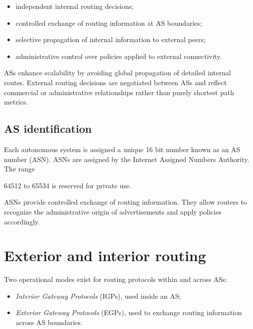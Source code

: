 \begin{itemize}
\item independent internal routing decisions;
\item controlled exchange of routing information at AS boundaries;
\item selective propagation of internal information to external peers;
\item administrative control over policies applied to external connectivity.
\end{itemize}

\begin{center}
\end{center}

ASs enhance scalability by avoiding global propagation of detailed internal routes. External routing decisions are negotiated between ASs and reflect commercial or administrative relationships rather than purely shortest path metrics.

\subsection{AS identification}

Each autonomous system is assigned a unique 16 bit number known as an AS number (ASN). ASNs are assigned by the Internet Assigned Numbers Authority. The range

64512 to 65534 is reserved for private use.

ASNs provide controlled exchange of routing information. They allow routers to recognize the administrative origin of advertisements and apply policies accordingly.

\section{Exterior and interior routing}

Two operational modes exist for routing protocols within and across ASs:

\begin{itemize}
\item \emph{Interior Gateway Protocols} (IGPs), used inside an AS;
\item \emph{Exterior Gateway Protocols} (EGPs), used to exchange routing information across AS boundaries.
\end{itemize}

\begin{center}
\end{center}

